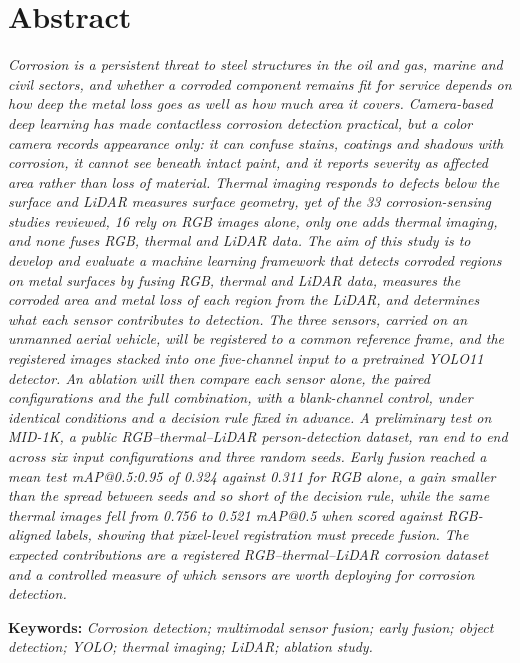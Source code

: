 \chapter*{Abstract}

\emph{Corrosion is a persistent threat to steel structures in the oil and
gas, marine and civil sectors, and whether a corroded component remains fit
for service depends on how deep the metal loss goes as well as how much area
it covers. Camera-based deep learning has made contactless corrosion
detection practical, but a color camera records appearance only: it can
confuse stains, coatings and shadows with corrosion, it cannot see beneath
intact paint, and it reports severity as affected area rather than loss of
material. Thermal imaging responds to defects below the surface and LiDAR
measures surface geometry, yet of the 33 corrosion-sensing studies reviewed,
16 rely on RGB images alone, only one adds thermal imaging, and none fuses
RGB, thermal and LiDAR data. The aim of this
study is to develop and evaluate a machine learning framework that detects
corroded regions on metal surfaces by fusing RGB, thermal and LiDAR data,
measures the corroded area and metal loss of each region from the LiDAR, and
determines what each sensor contributes to detection. The three sensors,
carried on an unmanned aerial vehicle, will be registered to a common
reference frame, and the registered images stacked into one five-channel
input to a pretrained YOLO11 detector. An ablation will then compare each
sensor alone, the paired configurations and the full combination, with a
blank-channel control, under identical conditions and a decision rule fixed
in advance. A
preliminary test on MID-1K, a public RGB--thermal--LiDAR person-detection
dataset, ran end to end across six input configurations and three random
seeds. Early fusion reached a mean test mAP@0.5:0.95 of 0.324 against 0.311
for RGB alone, a gain smaller than the spread between seeds and so short of
the decision rule, while the same thermal images fell from 0.756 to 0.521
mAP@0.5 when scored against RGB-aligned labels, showing that pixel-level
registration must precede fusion. The expected contributions are a registered RGB--thermal--LiDAR
corrosion dataset and a controlled measure of which sensors are worth
deploying for corrosion detection.}

\vspace{0.8\baselineskip}

\noindent\textbf{Keywords:} \emph{Corrosion detection; multimodal sensor
fusion; early fusion; object detection; YOLO; thermal imaging; LiDAR; ablation
study.}
